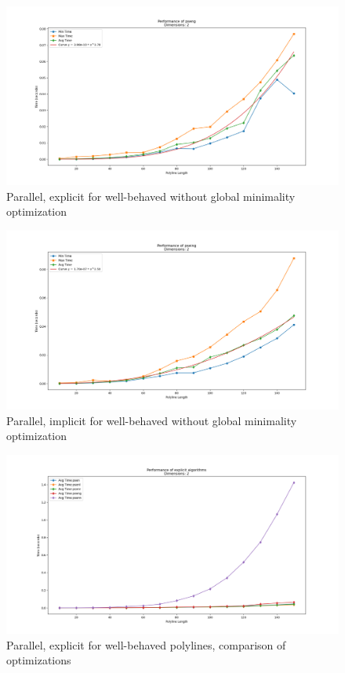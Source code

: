 \begin{figure}[ht]
  \centering
  \includegraphics[scale=0.5, width=\linewidth]{figures/pseng.png}
  \caption{Parallel, explicit for well-behaved without global minimality optimization}
  \label{fig:pseng}
\end{figure}

\begin{figure}[ht]
  \centering
  \includegraphics[scale=0.5, width=\linewidth]{figures/pseing.png}
  \caption{Parallel, implicit for well-behaved without global minimality optimization}
  \label{fig:pseing}
\end{figure}

\begin{figure}[ht]
  \centering
  \includegraphics[scale=0.5, width=\linewidth]{figures/psen-opt1.png}
  \caption{Parallel, explicit for well-behaved polylines, comparison of optimizations}
  \label{fig:psen-opt1}
\end{figure}


